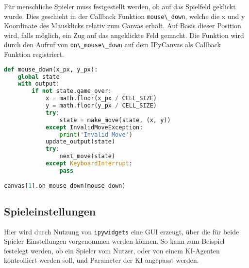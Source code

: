 Für menschliche Spieler muss festgestellt werden, ob auf das Spielfeld
geklickt wurde. Dies geschieht in der Callback Funktion
\passthrough{\lstinline!mouse\_down!}, welche die x und y Koordinate des
Mausklicks relativ zum Canvas erhält. Auf Basis dieser Position wird,
falls möglich, ein Zug auf das angeklickte Feld gemacht. Die Funktion
wird durch den Aufruf von \passthrough{\lstinline!on\_mouse\_down!} auf
dem IPyCanvas als Callback Funktion registriert.

\begin{lstlisting}[language=Python]
def mouse_down(x_px, y_px):
    global state
    with output:
        if not state.game_over:
            x = math.floor(x_px / CELL_SIZE)
            y = math.floor(y_px / CELL_SIZE)
            try:
                state = make_move(state, (x, y))
            except InvalidMoveException:
                print('Invalid Move')
            update_output(state)
            try:
                next_move(state)
            except KeyboardInterrupt:
                pass

canvas[1].on_mouse_down(mouse_down)
\end{lstlisting}

\hypertarget{spieleinstellungen}{%
\subsection{Spieleinstellungen}\label{spieleinstellungen}}

Hier wird durch Nutzung von \passthrough{\lstinline!ipywidgets!} eine
\ac{GUI} erzeugt, über die für beide Spieler Einstellungen vorgenommen
werden können. So kann zum Beispiel festelegt werden, ob ein Spieler vom
Nutzer, oder von einem \ac{KI}-Agenten kontrolliert werden soll, und
Parameter der \ac{KI} angepasst werden.

